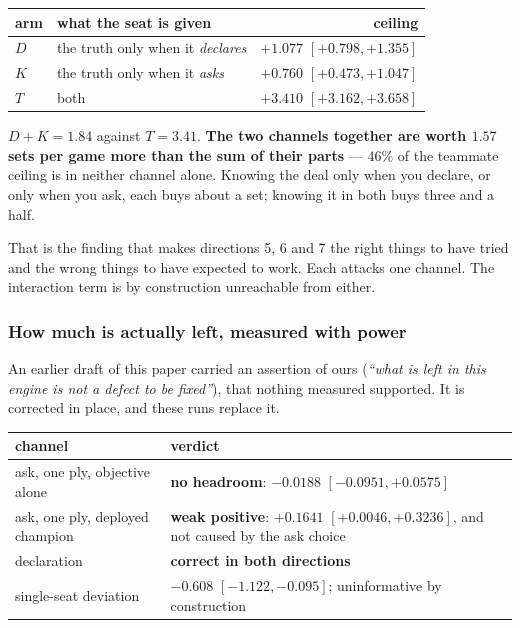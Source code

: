 \documentclass[11pt,letterpaper]{article}
\begin{document}
\begin{center}\small
\begin{tabular}{@{}llr@{}}
\toprule
arm & what the seat is given & ceiling \\
\midrule
$D$ & the truth only when it \emph{declares} & $+1.077$ $[+0.798, +1.355]$ \\
$K$ & the truth only when it \emph{asks} & $+0.760$ $[+0.473, +1.047]$ \\
$T$ & both & $+3.410$ $[+3.162, +3.658]$ \\
\bottomrule
\end{tabular}
\end{center}

$D + K = 1.84$ against $T = 3.41$. \textbf{The two channels together are worth
$1.57$ sets per game more than the sum of their parts} --- $46\%$ of the
teammate ceiling is in neither channel alone. Knowing the deal only when you
declare, or only when you ask, each buys about a set; knowing it in both buys
three and a half.

That is the finding that makes directions 5, 6 and 7 the right things to have
tried and the wrong things to have expected to work. Each attacks one channel.
The interaction term is by construction unreachable from either.

\subsubsection{How much is actually left, measured with power}

An earlier draft of this paper carried an assertion of ours (\emph{``what is
left in this engine is not a defect to be fixed''}), that nothing measured
supported. It is corrected in place, and these runs replace it.

\begin{center}\small
\begin{tabular}{@{}lp{8.4cm}@{}}
\toprule
channel & verdict \\
\midrule
ask, one ply, objective alone & \textbf{no headroom}: $-0.0188$ $[-0.0951, +0.0575]$ \\
ask, one ply, deployed champion & \textbf{weak positive}: $+0.1641$ $[+0.0046, +0.3236]$, and not caused by the ask choice \\
declaration & \textbf{correct in both directions} \\
single-seat deviation & $-0.608$ $[-1.122, -0.095]$; uninformative by construction \\
\bottomrule
\end{tabular}
\end{center}
\end{document}
